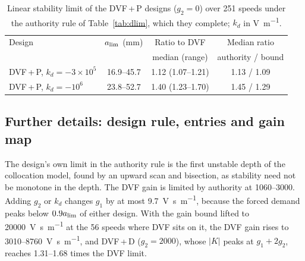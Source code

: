 \begin{table}[!htbp]
  \centering
  \caption{Linear stability limit of the DVF\,+\,P designs ($g_2=0$) over 251 speeds under the authority rule of Table~\ref{tab:dlim}, which they complete; $k_d$ in \si{\volt\per\metre}.}
  \label{tab:supp-dlim-p}
  \small
  \begin{tabular}{@{}lccc@{}}
    \toprule
    Design & $a_{\lim}$ (\si{\milli\metre}) & Ratio to DVF & Median ratio\\
     & & median (range) & authority / bound\\
    \midrule
    DVF\,+\,P, $k_d=-3\times10^5$ & 16.9--45.7 & 1.12 (1.07--1.21) & 1.13 / 1.09\\
    DVF\,+\,P, $k_d=-10^6$ & 23.8--52.7 & 1.40 (1.23--1.70) & 1.45 / 1.29\\
    \bottomrule
  \end{tabular}
\end{table}

\subsection{Further details: design rule, entries and gain map}\label{supp:delayed-details}

The design's own limit in the authority rule is the first unstable depth of the collocation model, found by an upward scan and bisection, as stability need not be monotone in the depth. The DVF gain is limited by authority at \SIrange{1060}{3000}{\rpm}. Adding $g_2$ or $k_d$ changes $g_1$ by at most \SI{9.7}{\volt\second\per\metre}, because the forced demand peaks below $0.9a_{\lim}$ of either design. With the gain bound lifted to \SI{20000}{\volt\second\per\metre} at the 56 speeds where DVF sits on it, the DVF gain rises to 3010--\SI{8760}{\volt\second\per\metre}, and DVF\,+\,D ($g_2=2000$), whose $\lvert K\rvert$ peaks at $g_1+2g_2$, reaches 1.31--1.68 times the DVF limit.

